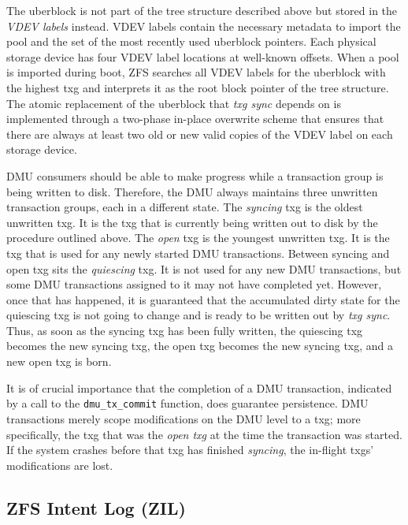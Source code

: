 \documentclass[12pt,a4paper,twoside]{book}
\begin{document}
The uberblock is not part of the tree structure described above but stored in the \textit{VDEV labels} instead.
VDEV labels contain the necessary metadata to import the pool and the set of the most recently used uberblock pointers.
Each physical storage device has four VDEV label locations at well-known offsets.
When a pool is imported during boot, ZFS searches all VDEV labels for the uberblock with the highest txg and interprets it as the root block pointer of the tree structure.
The atomic replacement of the uberblock that \textit{txg sync} depends on is implemented through a two-phase in-place overwrite scheme that ensures that there are always at least two old or new valid copies of the VDEV label on each storage device.

DMU consumers should be able to make progress while a transaction group is being written to disk.
Therefore, the DMU always maintains three unwritten transaction groups, each in a different state.
The \textit{syncing} txg is the oldest unwritten txg.
It is the txg that is currently being written out to disk by the procedure outlined above.
The \textit{open} txg is the youngest unwritten txg.
It is the txg that is used for any newly started DMU transactions.
Between syncing and open txg sits the \textit{quiescing} txg.
It is not used for any new DMU transactions, but some DMU transactions assigned to it may not have completed yet.
However, once that has happened, it is guaranteed that the accumulated dirty state for the quiescing txg is not going to change and is ready to be written out by \textit{txg sync}.
Thus, as soon as the syncing txg has been fully written, the quiescing txg becomes the new syncing txg, the open txg becomes the new syncing txg, and a new open txg is born.

It is of crucial importance that the completion of a DMU transaction, indicated by a call to the \lstinline{dmu_tx_commit} function, does \underline{} guarantee persistence.
DMU transactions merely scope modifications on the DMU level to a txg; more specifically, the txg that was the \textit{open txg} at the time the transaction was started.
If the system crashes before that txg has finished \textit{syncing}, the in-flight txgs' modifications are lost.

\subsection{ZFS Intent Log (ZIL)}\label{openzfs:the_zil_api}
\end{document}
